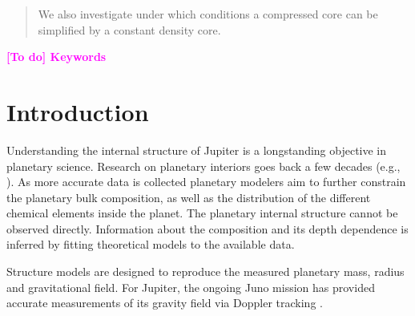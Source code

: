 \documentclass[usenatbib]{mnras}
\def\gsim{\mathrel{\rlap{\lower 3pt \hbox{$\sim$}} \raise 2.0pt \hbox{$>$}}}
\newcommand{\TD}[1]{\textcolor{magenta}{\bf [To do] #1}}
\newcommand{\sub}[1]{_{\text{#1}}}
\begin{document}
\begin{abstract}
We also investigate under which conditions a compressed core can be simplified by a constant density core.  %
\end{abstract}

\begin{keywords}
\TD{Keywords}
\end{keywords}


\section{Introduction}\label{sec:introduction}
Understanding the internal structure of Jupiter is a longstanding objective in planetary science. 
Research on planetary interiors goes back a few decades (e.g., \cite{Podolak1974, Decampli1979}).
As more accurate data is collected planetary modelers aim to further constrain the planetary bulk composition, as well as the distribution of the different chemical elements inside the planet.
The planetary internal structure cannot be observed directly. Information about the composition and its depth dependence is inferred by fitting theoretical models to the available data.

Structure models are designed to reproduce the measured planetary mass, radius and gravitational field. 
For Jupiter, the ongoing Juno mission has provided accurate measurements of its gravity field via Doppler tracking \citep{NatureIess, Folkner2017, Bolton2017}.
\par
\end{document}
